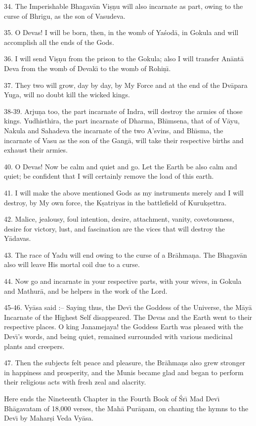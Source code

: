 34. The Imperishable Bhagav\=an Vi\d{s}\d{n}u will also incarnate as part, owing to the curse of Bhrigu, as the son of Vasudeva.

35. O Devas! I will be born, then, in the womb of Ya\'sod\=a, in Gokula and will accomplish all the ends of the Gods.

36. I will send Vi\d{s}\d{n}u from the prison to the Gokula; also I will transfer An\=ant\=a Deva from the womb of Devak\={\i} to the womb of Rohi\d{n}\={\i}.

37. They two will grow, day by day, by My Force and at the end of the Dv\=apara Yuga, will no doubt kill the wicked kings.

38-39. Arju\d{n}a too, the part incarnate of Indra, will destroy the armies of those kings. Yudhisthira, the part incarnate of Dharma, Bh\={\i}msena, that of of V\=ayu, Nakula and Sahadeva the incarnate of the two A'svins, and Bh\={\i}sma, the incarnate of Vasu as the son of the Gang\=a, will take their respective births and exhaust their armies.

40. O Devas! Now be calm and quiet and go. Let the Earth be also calm and quiet; be confident that I will certainly remove the load of this earth.

41. I will make the above mentioned Gods as my instruments merely and I will destroy, by My own force, the K\d{s}atriyas in the battlefield of Kuruk\d{s}ettra.

42. Malice, jealousy, foul intention, desire, attachment, vanity, covetousness, desire for victory, lust, and fascination are the vices that will destroy the Y\=adavas.

43. The race of Yadu will end owing to the curse of a Br\=ahma\d{n}a. The Bhagav\=an also will leave His mortal coil due to a curse.

44. Now go and incarnate in your respective parts, with your wives, in Gokula and Mathur\=a, and be helpers in the work of the Lord.

45-46. Vy\=asa said :-- Saying thus, the Dev\={\i} the Goddess of the Universe, the M\=ay\=a Incarnate of the Highest Self disappeared. The Devas and the Earth went to their respective places. O king Janamejaya! the Goddess Earth was pleased with the Dev\={\i}'s words, and being quiet, remained surrounded with various medicinal plants and creepers.

47. Then the subjects felt peace and pleasure, the Br\=ahma\d{n}s also grew stronger in happiness and prosperity, and the Munis became glad and began to perform their religious acts with fresh zeal and alacrity.

Here ends the Nineteenth Chapter in the Fourth Book of \'Sr\={\i} Mad Dev\={\i} Bh\=agavatam of 18,000 verses, the Mah\=a Pur\=a\d{n}am, on chanting the hymns to the Dev\={\i} by Mahar\d{s}i Veda Vy\=asa.




